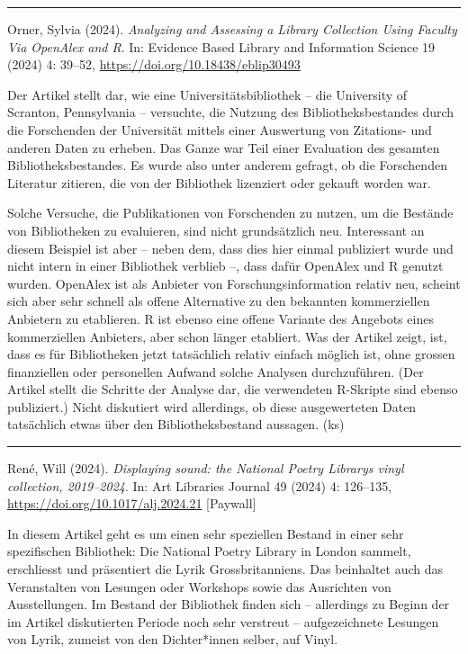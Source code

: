 \documentclass[a4paper,
fontsize=11pt,
oneside,
numbers=noperiodatend,
parskip=half-,
bibliography=totoc,
final
]{scrartcl}
\begin{document}
\begin{center}\rule{0.5\linewidth}{0.5pt}\end{center}

Orner, Sylvia (2024). \emph{Analyzing and Assessing a Library Collection
Using Faculty Via OpenAlex and R}. In: Evidence Based Library and
Information Science 19 (2024) 4: 39--52,
\url{https://doi.org/10.18438/eblip30493}

Der Artikel stellt dar, wie eine Universitätsbibliothek -- die
University of Scranton, Pennsylvania -- versuchte, die Nutzung des
Bibliotheksbestandes durch die Forschenden der Universität mittels einer
Auswertung von Zitations- und anderen Daten zu erheben. Das Ganze war
Teil einer Evaluation des gesamten Bibliotheksbestandes. Es wurde also
unter anderem gefragt, ob die Forschenden Literatur zitieren, die von
der Bibliothek lizenziert oder gekauft worden war.

Solche Versuche, die Publikationen von Forschenden zu nutzen, um die
Bestände von Bibliotheken zu evaluieren, sind nicht grundsätzlich neu.
Interessant an diesem Beispiel ist aber -- neben dem, dass dies hier
einmal publiziert wurde und nicht intern in einer Bibliothek verblieb
--, dass dafür OpenAlex und R genutzt wurden. OpenAlex ist als Anbieter
von Forschungsinformation relativ neu, scheint sich aber sehr schnell
als offene Alternative zu den bekannten kommerziellen Anbietern zu
etablieren. R ist ebenso eine offene Variante des Angebots eines
kommerziellen Anbieters, aber schon länger etabliert. Was der Artikel
zeigt, ist, dass es für Bibliotheken jetzt tatsächlich relativ einfach
möglich ist, ohne grossen finanziellen oder personellen Aufwand solche
Analysen durchzuführen. (Der Artikel stellt die Schritte der Analyse
dar, die verwendeten R-Skripte sind ebenso publiziert.) Nicht diskutiert
wird allerdings, ob diese ausgewerteten Daten tatsächlich etwas über den
Bibliotheksbestand aussagen. (ks)

\begin{center}\rule{0.5\linewidth}{0.5pt}\end{center}

René, Will (2024). \emph{Displaying sound: the National Poetry
Library\textquotesingle s vinyl collection, 2019--2024}. In: Art
Libraries Journal 49 (2024) 4: 126--135,
\url{https://doi.org/10.1017/alj.2024.21} {[}Paywall{]}

In diesem Artikel geht es um einen sehr speziellen Bestand in einer sehr
spezifischen Bibliothek: Die National Poetry Library in London sammelt,
erschliesst und präsentiert die Lyrik Grossbritanniens. Das beinhaltet
auch das Veranstalten von Lesungen oder Workshops sowie das Ausrichten
von Ausstellungen. Im Bestand der Bibliothek finden sich -- allerdings
zu Beginn der im Artikel diskutierten Periode noch sehr verstreut --
aufgezeichnete Lesungen von Lyrik, zumeist von den Dichter*innen selber,
auf Vinyl.
\end{document}
